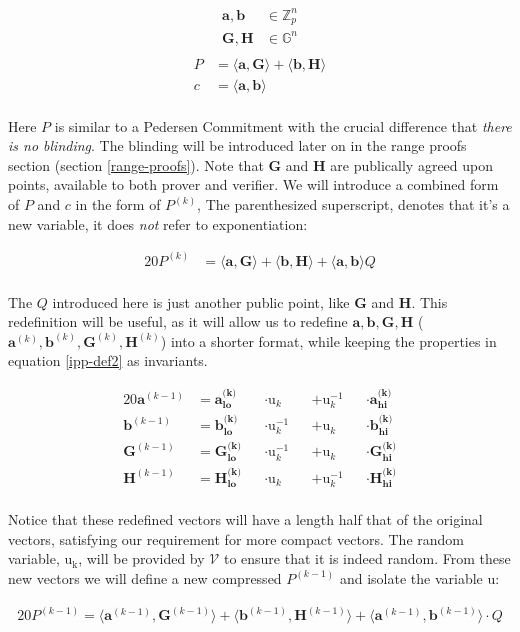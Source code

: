 \documentclass{article}
\newcommand{\eq}[1]{\begin{alignat*}{20}#1\end{alignat*}}
\newcommand{\eqn}[2]{\begin{equation}\label{#1}\begin{split}#2\end{split}\end{equation}}
\renewcommand{\vec}[1]{\boldsymbol{#1}}
\newcommand{\ran}[1]{\mathrm{#1}}
\newcommand{\V}{\mathcal{V}}
\newcommand{\G}{\mathbb{G}}
\newcommand{\Z}{\mathbb{Z}}
\newcommand{\dotp}[2]{\langle #1, #2 \rangle}
\newcommand{\opn}[1]{\operatorname{#1}}
\newcommand{\veclo}[1]{\vec{#1_{\opn{lo}}}}
\newcommand{\vechi}[1]{\vec{#1_{\opn{hi}}}}
\begin{document}
\eqn{ipp-def1}{
	\vec{a}, \vec{b} &\in \Z^n_p \\
	\vec{G}, \vec{H} &\in \G^n \\
}
\eqn{ipp-def2}{
	P &= \dotp{\vec{a}}{\vec{G}} + \dotp{\vec{b}}{\vec{H}} \\
	c &= \dotp{\vec{a}}{\vec{b}} \\
}

Here $P$ is similar to a Pedersen Commitment with the crucial difference
that \textit{there is no blinding}. The blinding will be introduced
later on in the range proofs section (section \ref{range-proofs}). Note
that $\vec{G}$ and $\vec{H}$ are publically agreed upon points,
available to both prover and verifier. We will introduce a combined
form of $P$ and $c$ in the form of $P^{(k)}$, The parenthesized
superscript, denotes that it's a new variable, it does \textit{not}
refer to exponentiation:

\eq{
	P^{(k)} &= \dotp{\vec{a}}{\vec{G}} +
	           \dotp{\vec{b}}{\vec{H}} +
	           \dotp{\vec{a}}{\vec{b}}Q \\
} 

The $Q$ introduced here is just another public point,
like $\vec{G}$ and $\vec{H}$. This redefinition will be useful, as
it will allow us to redefine $\vec{a}, \vec{b}, \vec{G}, \vec{H}$
($\vec{a}^{(k)}, \vec{b}^{(k)}, \vec{G}^{(k)}, \vec{H}^{(k)}$) into a
shorter format, while keeping the properties in equation \ref{ipp-def2}
as invariants.

\eq{
	\vec{a}^{(k-1)} &= \veclo{a^{\text{(k)}}} &&\cdot \ran{u}_k      &&+ \ran{u}^{-1}_k &&\cdot \vechi{a^{\text{(k)}}} \\
	\vec{b}^{(k-1)} &= \veclo{b^{\text{(k)}}} &&\cdot \ran{u}^{-1}_k &&+ \ran{u}_k      &&\cdot \vechi{b^{\text{(k)}}} \\
	\vec{G}^{(k-1)} &= \veclo{G^{\text{(k)}}} &&\cdot \ran{u}^{-1}_k &&+ \ran{u}_k      &&\cdot \vechi{G^{\text{(k)}}} \\
	\vec{H}^{(k-1)} &= \veclo{H^{\text{(k)}}} &&\cdot \ran{u}_k      &&+ \ran{u}^{-1}_k &&\cdot \vechi{H^{\text{(k)}}} \\
}

Notice that these redefined vectors will have a length half that
of the original vectors, satisfying our requirement for more compact
vectors. The random variable, $\ran{u_k}$, will be provided by $\V$
to ensure that it is indeed random. From these new vectors we will
define a new compressed $P^{(k-1)}$ and isolate the variable $\ran{u}$:

\eq{
	P^{(k-1)} =
	\dotp{\vec{a}^{(k-1)}}{\vec{G}^{(k-1)}} +
	\dotp{\vec{b}^{(k-1)}}{\vec{H}^{(k-1)}} +
	\dotp{\vec{a}^{(k-1)}}{\vec{b}^{(k-1)}} \cdot Q
}
\end{document}
